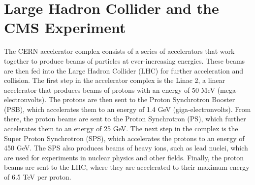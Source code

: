 
\section{Large Hadron Collider and the CMS Experiment}

The CERN accelerator complex consists of a series of accelerators that work together to produce beams of particles at ever-increasing energies. These beams are then fed into the Large Hadron Collider (LHC) for further acceleration and collision. The first step in the accelerator complex is the Linac 2, a linear accelerator that produces beams of protons with an energy of 50 MeV (mega-electronvolts). The protons are then sent to the Proton Synchrotron Booster (PSB), which accelerates them to an energy of 1.4 GeV (giga-electronvolts). From there, the proton beams are sent to the Proton Synchrotron (PS), which further accelerates them to an energy of 25 GeV. The next step in the complex is the Super Proton Synchrotron (SPS), which accelerates the protons to an energy of 450 GeV. The SPS also produces beams of heavy ions, such as lead nuclei, which are used for experiments in nuclear physics and other fields. Finally, the proton beams are sent to the LHC, where they are accelerated to their maximum energy of 6.5 TeV per proton.

